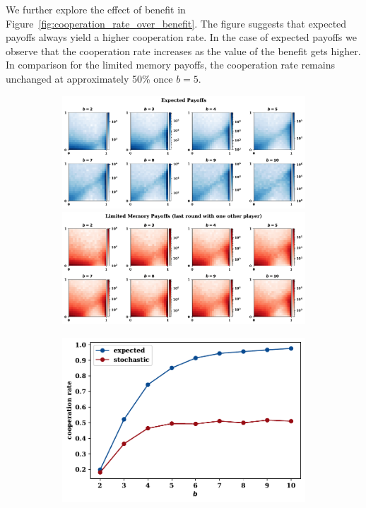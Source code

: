 \documentclass[11pt]{article}
\theoremstyle{plainCl1}
\theoremstyle{plainCl2}
\begin{document}
We further explore the effect of benefit in
Figure~\ref{fig:cooperation_rate_over_benefit}. The figure suggests that
expected payoffs always yield a higher cooperation rate. In the case of expected
payoffs we observe that the cooperation rate increases as the value of the
benefit gets higher. In comparison for the limited memory payoffs, the
cooperation rate remains unchanged at approximately 50\% once \(b=5\).

\begin{figure}[!htbp]
  \centering
  \begin{subfigure}{.5\textwidth}
    \centering
    \includegraphics[width=.8\textwidth]{static/expected_for_beta.pdf}
    \includegraphics[width=.8\textwidth]{static/stochastic_for_beta.pdf}
  \end{subfigure}%
  \begin{subfigure}{.5\textwidth}
    \centering
    \includegraphics[width=.8\textwidth]{static/cooperation_rate_over_b.pdf}

\end{subfigure}
\end{figure}
\end{document}
